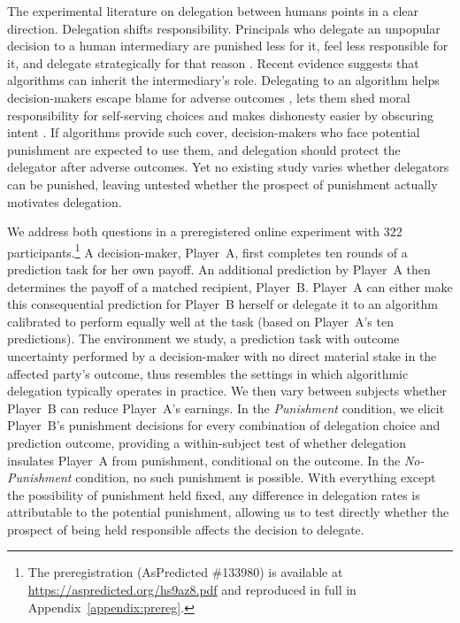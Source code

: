 The experimental literature on delegation between humans points in a clear direction. Delegation shifts responsibility. Principals who delegate an unpopular decision to a human intermediary are punished less for it, feel less responsible for it, and delegate strategically for that reason \citep{bartling_shifting_2012, hamman_self-interest_2010, coffman_intermediation_2011, oexl_shifting_2013}. Recent evidence suggests that algorithms can inherit the intermediary's role. Delegating to an algorithm helps decision-makers escape blame for adverse outcomes \citep{feier_hiding_2022}, lets them shed moral responsibility for self-serving choices \citep{tontrup_strategic_2025} and makes dishonesty easier by obscuring intent \citep{kobis_delegation_2025}. If algorithms provide such cover, decision-makers who face potential punishment are expected to use them, and delegation should protect the delegator after adverse outcomes. Yet no existing study varies whether delegators can be punished, leaving untested whether the prospect of punishment actually motivates delegation.

We address both questions in a preregistered online experiment with 322 participants.\footnote{The preregistration (AsPredicted \#133980) is available at \url{https://aspredicted.org/hs9az8.pdf} and reproduced in full in Appendix~\ref{appendix:prereg}.} A decision-maker, Player~A, first completes ten rounds of a prediction task for her own payoff. An additional prediction by Player~A then determines the payoff of a matched recipient, Player~B. Player~A can either make this consequential prediction for Player~B herself or delegate it to an algorithm calibrated to perform equally well at the task (based on Player~A's ten predictions). The environment we study, a prediction task with outcome uncertainty performed by a decision-maker with no direct material stake in the affected party's outcome, thus resembles the settings in which algorithmic delegation typically operates in practice. We then vary between subjects whether Player~B can reduce Player~A's earnings. In the \textit{Punishment} condition, we elicit Player~B's punishment decisions for every combination of delegation choice and prediction outcome, providing a within-subject test of whether delegation insulates Player~A from punishment, conditional on the outcome. In the \textit{No-Punishment} condition, no such punishment is possible. With everything except the possibility of punishment held fixed, any difference in delegation rates is attributable to the potential punishment, allowing us to test directly whether the prospect of being held responsible affects the decision to delegate.

